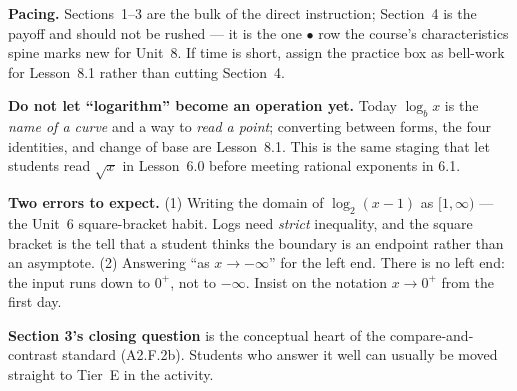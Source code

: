 \documentclass[10pt]{article}
\begin{document}
\begin{teachernote}
\textbf{Pacing.} Sections~1--3 are the bulk of the direct instruction; Section~4 is the payoff and
should not be rushed --- it is the one $\bullet$ row the course's characteristics spine marks new for
Unit~8. If time is short, assign the practice box as bell-work for Lesson~8.1 rather than cutting
Section~4.

\textbf{Do not let ``logarithm'' become an operation yet.} Today $\log_b x$ is the \emph{name of a
curve} and a way to \emph{read a point}; converting between forms, the four identities, and change of
base are Lesson~8.1. This is the same staging that let students read $\sqrt{x}$ in Lesson~6.0 before
meeting rational exponents in 6.1.

\textbf{Two errors to expect.} (1) Writing the domain of $\log_2(x-1)$ as $[1,\infty)$ --- the
Unit~6 square-bracket habit. Logs need \emph{strict} inequality, and the square bracket is the tell
that a student thinks the boundary is an endpoint rather than an asymptote. (2) Answering ``as
$x\to-\infty$'' for the left end. There is no left end: the input runs down to $0^{+}$, not to
$-\infty$. Insist on the notation $x\to 0^{+}$ from the first day.

\textbf{Section 3's closing question} is the conceptual heart of the compare-and-contrast standard
(A2.F.2b). Students who answer it well can usually be moved straight to Tier~E in the activity.
\end{teachernote}
\end{document}
